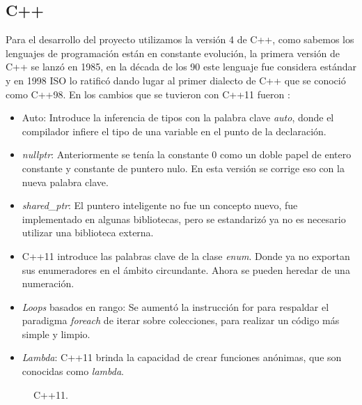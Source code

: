 \documentclass[conference]{IEEEtran}
\begin{document}
    \subsection{C++}
    Para el desarrollo del proyecto utilizamos la versión 4 de C++, como sabemos los lenguajes de programación están en constante evolución, la primera versión de C++ se lanzó en 1985, en la década de los 90 este lenguaje fue considera estándar y en 1998 ISO lo ratificó dando lugar al primer dialecto de C++ que se conoció como C++98. En los cambios que se tuvieron con C++11 fueron \citep{c11}:
    \begin{itemize}
        \item Auto: Introduce la inferencia de tipos con la palabra clave \textit{auto}, donde el compilador infiere el tipo de una variable en el punto de la declaración.
        \item \textit{nullptr}: Anteriormente se tenía la constante 0 como un doble papel de entero constante y constante de puntero nulo. En esta versión se corrige eso con la nueva palabra clave.
        \item \textit{shared\_ptr}: El puntero inteligente no fue un concepto nuevo, fue implementado en algunas bibliotecas, pero se estandarizó ya no es necesario utilizar una biblioteca externa.
        \item  C++11 introduce las palabras clave de la clase \textit{enum}. Donde ya no exportan sus enumeradores en el ámbito circundante. Ahora se pueden heredar de una numeración.
        \item \textit{Loops} basados en rango: Se aumentó la instrucción for para respaldar el paradigma \textit{foreach} de iterar sobre colecciones, para realizar un código más simple y limpio.
        \item \textit{Lambda}: C++11 brinda la capacidad de crear funciones anónimas, que son conocidas como \textit{lambda}.
    \end{itemize}
    
        \begin{figure}[ht]
        \caption{C++11.}
        \label{figiconqt}
    \end{figure}
\end{document}
